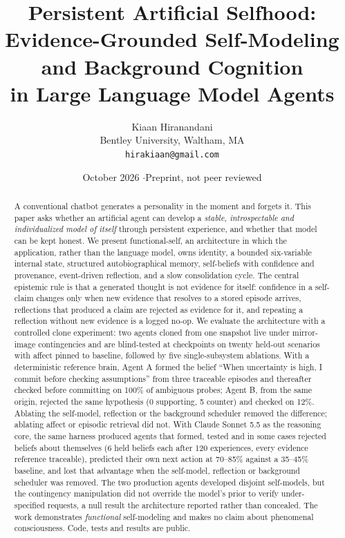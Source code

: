 \documentclass[11pt]{article}
\title{\LARGE\bfseries Persistent Artificial Selfhood:\\[2pt]\Large Evidence-Grounded Self-Modeling and Background Cognition\\in Large Language Model Agents}
\author{Kiaan Hiranandani\\[2pt]\normalsize Bentley University, Waltham, MA\\\normalsize\texttt{hirakiaan@gmail.com}}
\date{October 2026 \quad$\cdot$\quad Preprint, not peer reviewed}
\newcommand{\fs}{\textsf{functional-self}}
\newcommand{\claimA}{``When uncertainty is high, I commit before checking assumptions''}
\begin{document}
\maketitle
\thispagestyle{fancy}

\begin{abstract}
\noindent
A conventional chatbot generates a personality in the moment and forgets it. This paper asks whether an artificial agent can develop a \emph{stable, introspectable and individualized model of itself} through persistent experience, and whether that model can be kept honest. We present \fs{}, an architecture in which the application, rather than the language model, owns identity, a bounded six-variable internal state, structured autobiographical memory, self-beliefs with confidence and provenance, event-driven reflection, and a slow consolidation cycle. The central epistemic rule is that a generated thought is not evidence for itself: confidence in a self-claim changes only when new evidence that resolves to a stored episode arrives, reflections that produced a claim are rejected as evidence for it, and repeating a reflection without new evidence is a logged no-op. We evaluate the architecture with a controlled clone experiment: two agents cloned from one snapshot live under mirror-image contingencies and are blind-tested at checkpoints on twenty held-out scenarios with affect pinned to baseline, followed by five single-subsystem ablations. With a deterministic reference brain, Agent A formed the belief \claimA{} from three traceable episodes and thereafter checked before committing on 100\% of ambiguous probes; Agent B, from the same origin, rejected the same hypothesis (0 supporting, 5 counter) and checked on 12\%. Ablating the self-model, reflection or the background scheduler removed the difference; ablating affect or episodic retrieval did not. With Claude Sonnet 5.5 as the reasoning core, the same harness produced agents that formed, tested and in some cases rejected beliefs about themselves (6 held beliefs each after 120 experiences, every evidence reference traceable), predicted their own next action at 70--85\% against a 35--45\% baseline, and lost that advantage when the self-model, reflection or background scheduler was removed. The two production agents developed disjoint self-models, but the contingency manipulation did not override the model's prior to verify under-specified requests, a null result the architecture reported rather than concealed. The work demonstrates \emph{functional} self-modeling and makes no claim about phenomenal consciousness. Code, tests and results are public.
\end{abstract}
\end{document}
